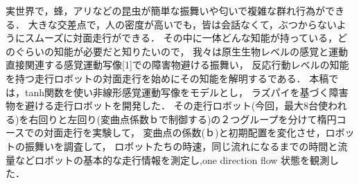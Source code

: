 実世界で，蜂，アリなどの昆虫が簡単な振舞いや匂いで複雑な群れ行為ができる．
大きな交差点で，人の密度が高いでも，皆は会話なくて，ぶつからないようにスムーズに対面走行ができる．
その中に一体どんな知能が持っている，どのぐらいの知能が必要だと知りたいので，
我々は原生生物レベルの感覚と運動直接関連する感覚運動写像[1]での障害物避ける振舞い，
反応行動レベルの知能を持つ走行ロボットの対面走行を始めにその知能を解明するである．
本稿では，tanh関数を使い非線形感覚運動写像をモデルとし，
ラズパイを基づく障害物を避ける走行ロボットを開発した．
その走行ロボット(今回，最大8台使われる)を右回りと左回り(変曲点係数ｂで制御する)の２つグループを分けて楕円コースでの対面走行を実験して，
変曲点の係数(ｂ)と初期配置を変化させ，ロボットの振舞いを調査して，
ロボットたちの時速，同じ流れになるまでの時間と流量などロボットの基本的な走行情報を測定し,one direction flow 状態を観測した．
